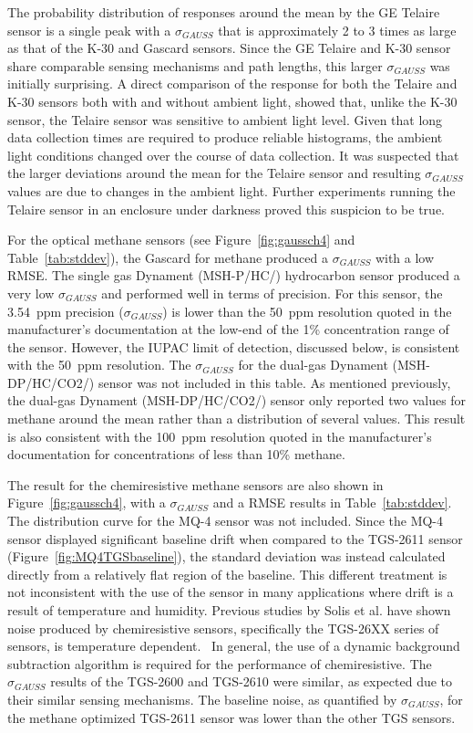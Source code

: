 \documentclass[times]{joehreview}
\begin{document}
	The probability distribution of responses around the mean by the GE Telaire sensor is a single peak with a $\sigma_{GAUSS}$ that is approximately 2 to 3 times as large as that of the K-30 and Gascard sensors.  Since the GE Telaire and K-30 sensor share comparable sensing mechanisms and path lengths, this larger $\sigma_{GAUSS}$ was initially surprising.  A direct comparison of the response for both the Telaire and K-30 sensors both with and without ambient light, showed that, unlike the K-30 sensor, the Telaire sensor was sensitive to ambient light level.  Given that long data collection times are required to produce reliable histograms, the ambient light conditions changed over the course of data collection.  It was suspected that the larger deviations around the mean for the Telaire sensor and resulting $\sigma_{GAUSS}$ values are due to changes in the ambient light.  Further experiments running the Telaire sensor in an enclosure under darkness proved this suspicion to be true.
	
	For the optical methane sensors (see Figure~\ref{fig:gaussch4} and Table~\ref{tab:stddev}), the Gascard for methane produced a $\sigma_{GAUSS}$ with a low RMSE. The single gas Dynament (MSH-P/HC/) hydrocarbon sensor produced a very low $\sigma_{GAUSS}$ and performed well in terms of precision.  For this sensor, the 3.54~ppm precision ($\sigma_{GAUSS}$) is lower than the 50~ppm resolution quoted in the manufacturer's documentation at the low-end of the 1\% concentration range of the sensor.  However, the IUPAC limit of detection, discussed below, is consistent with the 50~ppm resolution.  The $\sigma_{GAUSS}$ for the dual-gas Dynament (MSH-DP/HC/CO2/) sensor was not included in this table.  As mentioned previously, the dual-gas Dynament (MSH-DP/HC/CO2/) sensor only reported two values for methane around the mean rather than a distribution of several values.  This result is also consistent with the 100~ppm resolution quoted in the manufacturer's documentation for concentrations of less than 10\% methane.  
	
	The result for the chemiresistive methane sensors are also shown in Figure~\ref{fig:gaussch4}, with a $\sigma_{GAUSS}$ and a RMSE results in Table~\ref{tab:stddev}.  The distribution curve for the MQ-4 sensor was not included.  Since the MQ-4 sensor displayed significant baseline drift when compared to the TGS-2611 sensor (Figure~\ref{fig:MQ4TGSbaseline}), the standard deviation was instead calculated directly from a relatively flat region of the baseline.  This different treatment is not inconsistent with the use of the sensor in many applications where drift is a result of temperature and humidity.  Previous studies by Solis et al. have shown noise produced by chemiresistive sensors, specifically the TGS-26XX series of sensors, is temperature dependent.~\cite{solis_fluctuation-enhanced_2005} In general, the use of a dynamic background subtraction algorithm is required for the performance of chemiresistive.  The $\sigma_{GAUSS}$ results of the TGS-2600 and TGS-2610 were similar, as expected due to their similar sensing mechanisms.  The baseline noise, as quantified by $\sigma_{GAUSS}$, for the methane optimized TGS-2611 sensor was lower than the other TGS sensors.
	
\end{document}
